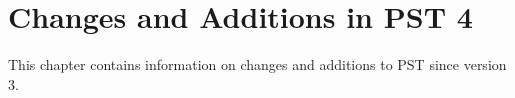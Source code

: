 \chapter{Changes and Additions in PST 4}
This chapter contains information on changes and additions to PST since version 3.









\pagebreak

\pagebreak


\pagebreak


\pagebreak

\pagebreak

\pagebreak


\pagebreak











\pagebreak

